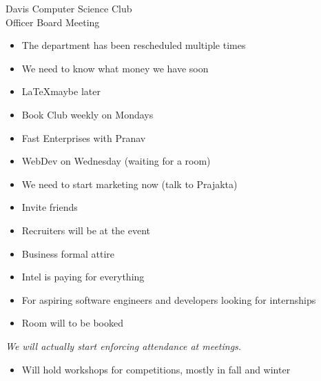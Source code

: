 \documentclass{article}
\begin{document}
\begin{Minutes}{Davis Computer Science Club\\Officer Board Meeting}
\missingExcused{}




\maketitle
{}
\begin{itemize}
\item The department has been rescheduled multiple times
\item We need to know what money we have soon
\end{itemize}
\begin{itemize}
\item \LaTeX maybe later
\item Book Club weekly on Mondays
\item Fast Enterprises with Pranav
\item WebDev on Wednesday (waiting for a room)
\end{itemize}
\begin{itemize}
\item We need to start marketing now (talk to Prajakta)
\item Invite friends
\item Recruiters will be at the event
\item Business formal attire
\item Intel is paying for everything
\item For aspiring software engineers and developers looking for internships
\item Room will to be booked
\end{itemize}
\textit{We will actually start enforcing attendance at meetings.}
\begin{itemize}
\item Will hold workshops for competitions, mostly in fall and winter

\end{itemize}
\end{Minutes}
\end{document}

